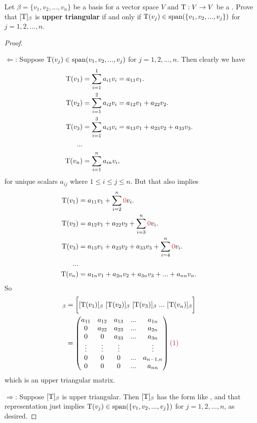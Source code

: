\begin{exercise} \label{exercise 2.2.12}
Let \(\beta = \{ v_1, v_2, ..., v_n \}\) be a basis for a vector space \(V\) and \(\mathrm{T} : V \to V\) be a \LTRAN{}.
Prove that \([\mathrm{T}]_{\beta}\) is \textbf{upper triangular} if and only if \(\mathrm{T}(v_j) \in \operatorname{span}(\{ v_1, v_2, ..., v_j \})\) for \(j = 1, 2, ..., n\).
\end{exercise}

\begin{proof} \ 

\(\Longleftarrow\): Suppose \(\mathrm{T}(v_j) \in \operatorname{span}(v_1, v_2, ..., v_j)\) for \(j = 1, 2, ..., n\).
Then clearly we have
\begin{align*}
    \mathrm{T}(v_1) & = \sum_{i = 1}^1 a_{i1} v_i = a_{11} v_1. \\
    \mathrm{T}(v_2) & = \sum_{i = 1}^2 a_{i2} v_i = a_{12} v_1 + a_{22} v_2. \\
    \mathrm{T}(v_3) & = \sum_{i = 1}^3 a_{i3} v_i = a_{13} v_1 + a_{23} v_2 + a_{33} v_3 . \\
    ... \\
    \mathrm{T}(v_n) & = \sum_{i = 1}^n a_{in} v_i,
\end{align*}
for unique scalars \(a_{ij}\) where \(1 \le i \le j \le n\).
But that also implies
\begin{align*}
    \T(v_1) & = a_{11} v_1 + \sum_{i = 2}^n \RED{0} v_i. \\
    \T(v_2) & = a_{12} v_1 + a_{22} v_2 + \sum_{i = 3}^n \RED{0} v_i. \\
    \T(v_3) & = a_{13} v_1 + a_{23} v_2 + a_{33} v_3 + \sum_{i = 4}^n \RED{0} v_i. \\
    ... \\
    \T(v_n) & = a_{1n} v_1 + a_{2n} v_2 + a_{3n} v_3 + ... + a_{nn} v_n.
\end{align*}
So
\begin{align*}
    [\T]_{\beta} & = \bigg[ [\T(v_1)]_{\beta}\ [\T(v_2)]_{\beta}\ [\T(v_3)]_{\beta}\ ...\ [\T(v_n)]_{\beta} \bigg] \\
    & = \begin{pmatrix}
        a_{11} & a_{12} & a_{13} & ... & a_{1n} \\
        0      & a_{22} & a_{23} & ... & a_{2n} \\
        0      & 0      & a_{33} & ... & a_{3n} \\
        \vdots & \vdots & \vdots &     & \vdots \\
        0      &      0 &      0 & ... & a_{n-1,n} \\
        0      &      0 &      0 & ... & a_{nn}
    \end{pmatrix} \MAROON{(1)}
\end{align*}
which is an upper triangular matrix.

\(\Longrightarrow\): Suppose \([\mathrm{T}]_{\beta}\) is upper triangular.
Then \([\mathrm{T}]_{\beta}\) has the form like , and that representation just implies \(\mathrm{T}(v_j) \in \operatorname{span}(\{ v_1, v_2, ..., v_j \})\) for \(j = 1, 2, ..., n\), as desired.
\end{proof}

